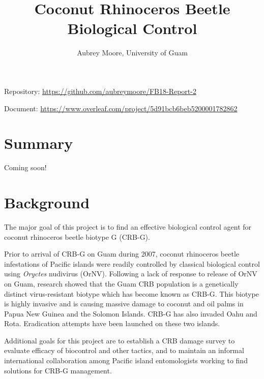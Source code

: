 \documentclass[12pt,letterpaper,english]{scrartcl}
\begin{document}
\titlehead{USDA APHIS Grant AP18PPQFO000C402\\
Progress Report 2\\
Report ID: AP18PPQFO000-PE-SA2-19\\
Performance Period: March 1, 2019 - August 31, 2019}
\title{Coconut Rhinoceros Beetle Biological Control}
\author{Aubrey Moore, University of Guam}
\maketitle

Repository: \url{https://github.com/aubreymoore/FB18-Report-2}

Document: \url{https://www.overleaf.com/project/5d91bcb6beb5200001782862}

\newpage
\tableofcontents{}




\newpage
\section{Summary}

Coming soon!




\newpage
\section{Background}

The major goal of this project is to find an effective biological
control agent for coconut rhinoceros beetle biotype G (CRB-G). 

Prior to arrival of CRB-G on Guam during 2007, coconut rhinoceros beetle
infestations of Pacific islands were readily controlled by classical
biological control using \textit{Oryctes} nudivirus (OrNV). Following a lack
of response to release of OrNV on Guam, research showed that the Guam
CRB population is a genetically distinct virus-resistant biotype which
has become known as CRB-G. This biotype is highly invasive and is
causing massive damage to coconut and oil palms in Papua New Guinea
and the Solomon Islands. CRB-G has also invaded Oahu and Rota. Eradication
attempts have been launched on these two islands. 

Additional goals for this project are to establish a CRB damage survey to evaluate efficacy of biocontrol and other tactics, and to maintain an informal international collaboration
among Pacific island entomologists working to find solutions for CRB-G
management. 
\end{document}
